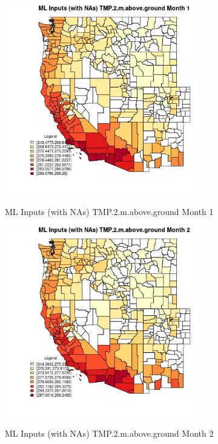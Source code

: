 \begin{figure} 
\centering  
\includegraphics[width=0.77\textwidth]{Code_Outputs/Report_ML_input_PM25_Step4_part_e_de_duplicated_aves_compiled_2019-05-21wNAs_CountyTMP2mabovegroundmedianMonth1.jpg} 
\caption{\label{fig:Report_ML_input_PM25_Step4_part_e_de_duplicated_aves_compiled_2019-05-21wNAsCountyTMP2mabovegroundmedianMonth1}ML Inputs (with NAs) TMP.2.m.above.ground Month 1} 
\end{figure} 
 

\begin{figure} 
\centering  
\includegraphics[width=0.77\textwidth]{Code_Outputs/Report_ML_input_PM25_Step4_part_e_de_duplicated_aves_compiled_2019-05-21wNAs_CountyTMP2mabovegroundmedianMonth2.jpg} 
\caption{\label{fig:Report_ML_input_PM25_Step4_part_e_de_duplicated_aves_compiled_2019-05-21wNAsCountyTMP2mabovegroundmedianMonth2}ML Inputs (with NAs) TMP.2.m.above.ground Month 2} 
\end{figure} 
 

